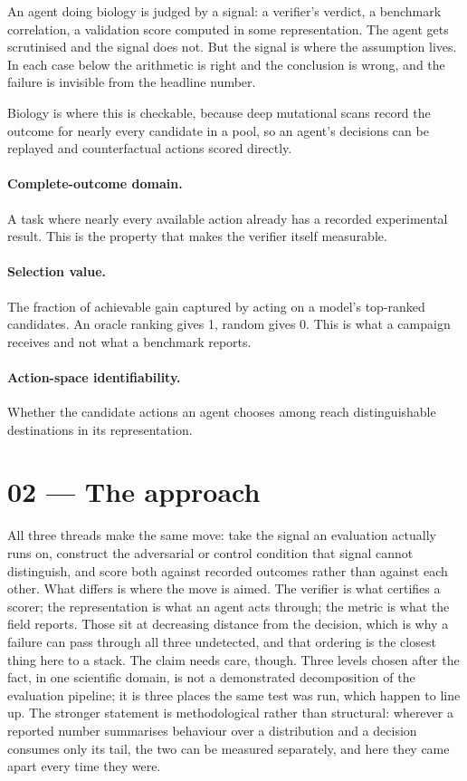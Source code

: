 \documentclass[11pt]{article}
\begin{document}
An agent doing biology is judged by a signal: a verifier's verdict, a benchmark correlation, a validation score
computed in some representation. The agent gets scrutinised and the signal does not. But the signal is where
the assumption lives. In each case below the arithmetic is right and the conclusion is wrong, and the failure
is invisible from the headline number.

Biology is where this is checkable, because deep mutational scans record the outcome for nearly every candidate
in a pool, so an agent's decisions can be replayed and counterfactual actions scored directly.

\paragraph{Complete-outcome domain.} A task where nearly every available action already has a recorded
experimental result. This is the property that makes the verifier itself measurable.

\paragraph{Selection value.} The fraction of achievable gain captured by acting on a model's top-ranked
candidates. An oracle ranking gives 1, random gives 0. This is what a campaign receives and not what a
benchmark reports.

\paragraph{Action-space identifiability.} Whether the candidate actions an agent chooses among reach
distinguishable destinations in its representation.

\section*{02 --- The approach}

All three threads make the same move: take the signal an evaluation actually runs on, construct the
adversarial or control condition that signal cannot distinguish, and score both against recorded outcomes
rather than against each other. What differs is where the move is aimed. The verifier is what certifies a
scorer; the representation is what an agent acts through; the metric is what the field reports. Those sit at
decreasing distance from the decision, which is why a failure can pass through all three undetected, and that
ordering is the closest thing here to a stack. The claim needs care, though. Three levels chosen after the
fact, in one scientific domain, is not a demonstrated decomposition of the evaluation pipeline; it is three
places the same test was run, which happen to line up. The stronger statement is methodological rather than
structural: wherever a reported number summarises behaviour over a distribution and a decision consumes only
its tail, the two can be measured separately, and here they came apart every time they were.
\end{document}
